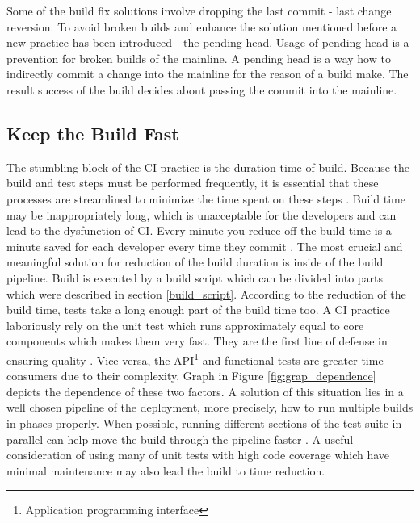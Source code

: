Some of the build fix solutions involve dropping the last commit - last change reversion. To avoid broken builds and enhance the solution mentioned before a new practice has been introduced - the pending head. Usage of pending head is a prevention for broken builds of the mainline. A pending head is a way how to indirectly commit a change into the mainline for the reason of a build make. The result success of the build decides about passing the commit into the mainline.

\subsection{Keep the Build Fast}

The stumbling block of the CI practice is the duration time of build. Because the build and test steps must be performed frequently, it is essential that these processes are streamlined to minimize the time spent on these steps \cite{DigitalOceanCI}. Build time may be inappropriately long, which is unacceptable for the developers and can lead to the dysfunction of CI. Every minute you reduce off the build time is a minute saved for each developer every time they commit \cite{MartinFowler}. The most crucial and meaningful solution for reduction of the build duration is inside of the build pipeline. Build is executed by a build script which can be divided into parts which were described in section \ref{build_script}. According to the reduction of the build time, tests take a long enough part of the build time too. A CI practice laboriously rely on the unit test which runs approximately equal to core components which makes them very fast. They are the first line of defense in ensuring quality \cite{CI_atlassian}. Vice versa, the API\footnote{Application programming interface} and functional tests are greater time consumers due to their complexity. Graph in Figure \ref{fig:grap_dependence} depicts the dependence of these two factors. A solution of this situation lies in a well chosen pipeline of the deployment, more  precisely, how to run multiple builds in phases properly. When possible, running different sections of the test suite in parallel can help move the build through the pipeline faster \cite{DigitalOceanCI}. A useful consideration of using many of unit tests with high code coverage which have minimal maintenance may also lead the build to time reduction.

